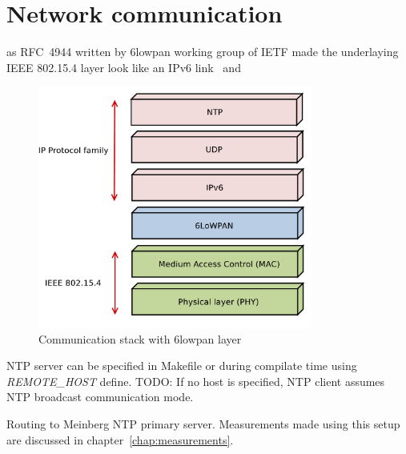 \section{Network communication}
as RFC~4944 written by 6lowpan working group of IETF
made the underlaying IEEE 802.15.4 layer
look like an IPv6 link~\cite{6lowpan} and
\begin{figure}
  \centering
  \includegraphics[width=9cm,keepaspectratio]{fig/6lowpan.pdf}
  \caption{Communication stack with 6lowpan layer}
  \label{fig:implementation-6lowpan}
  \bigskip
\end{figure}

NTP server can be specified in Makefile or
during compilate time using {\it{REMOTE\_HOST}} define.
TODO: If no host is specified,
NTP client assumes NTP broadcast communication mode.





Routing to Meinberg NTP primary server.
Measurements made using this setup are discussed in chapter~\ref{chap:measurements}.
